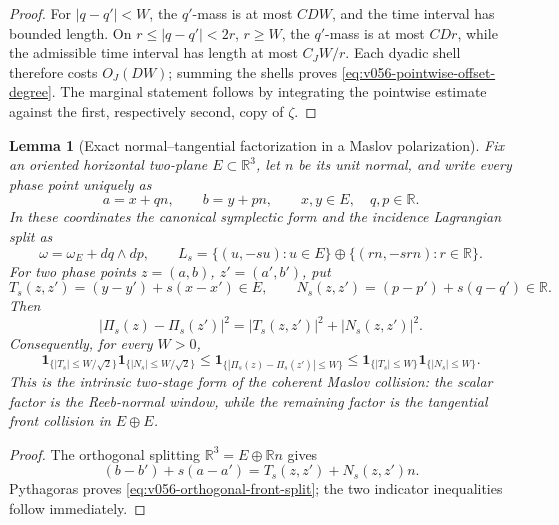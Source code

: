 \documentclass[10pt]{article}
\newtheorem{lemma}[theorem]{Lemma}
\begin{document}
\begin{proof}
For \(|q-q'|<W\), the \(q'\)-mass is at most \(CDW\), and the time interval has bounded length.
On \(r\le|q-q'|<2r\), \(r\ge W\), the \(q'\)-mass is at most \(CDr\), while the admissible time
interval has length at most \(C_JW/r\).  Each dyadic shell therefore costs \(O_J(DW)\); summing the
shells proves \eqref{eq:v056-pointwise-offset-degree}.  The marginal statement follows by
integrating the pointwise estimate against the first, respectively second, copy of \(\zeta\).
\end{proof}

\begin{lemma}[Exact normal--tangential factorization in a Maslov polarization]
\label{lem:v056-polarized-collision-factorization}
Fix an oriented horizontal two-plane \(E\subset\mathbb R^3\), let \(n\) be its unit normal, and
write every phase point uniquely as
\begin{equation}
\label{eq:v056-polarized-coordinates}
a=x+qn,
\qquad
b=y+pn,
\qquad
x,y\in E,\quad q,p\in\mathbb R.
\end{equation}
In these coordinates the canonical symplectic form and the incidence Lagrangian split as
\[
\omega
=
\omega_E+dq\wedge dp,
\qquad
L_s
=
\{(u,-su):u\in E\}
\oplus
\{(rn,-srn):r\in\mathbb R\}.
\]
For two phase points \(z=(a,b)\), \(z'=(a',b')\), put
\[
T_s(z,z')=(y-y')+s(x-x')\in E,
\qquad
N_s(z,z')=(p-p')+s(q-q')\in\mathbb R.
\]
Then
\begin{equation}
\label{eq:v056-orthogonal-front-split}
\boxed{
|\Pi_s(z)-\Pi_s(z')|^2
=
|T_s(z,z')|^2+|N_s(z,z')|^2.
}
\end{equation}
Consequently, for every \(W>0\),
\begin{equation}
\label{eq:v056-kernel-sandwich}
\mathbf 1_{\{|T_s|\le W/\sqrt2\}}
\mathbf 1_{\{|N_s|\le W/\sqrt2\}}
\le
\mathbf 1_{\{|\Pi_s(z)-\Pi_s(z')|\le W\}}
\le
\mathbf 1_{\{|T_s|\le W\}}
\mathbf 1_{\{|N_s|\le W\}}.
\end{equation}
This is the intrinsic two-stage form of the coherent Maslov collision: the scalar factor is the
Reeb-normal window, while the remaining factor is the tangential front collision in
\(E\oplus E\).
\end{lemma}

\begin{proof}
The orthogonal splitting \(\mathbb R^3=E\oplus\mathbb Rn\) gives
\[
(b-b')+s(a-a')
=
T_s(z,z')+N_s(z,z')n.
\]
Pythagoras proves \eqref{eq:v056-orthogonal-front-split}; the two indicator inequalities follow
immediately.
\end{proof}
\end{document}
